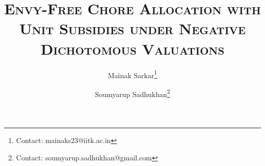 \documentclass[11pt]{article}
\begin{document}
\makeatletter
\renewcommand\@makefnmark{\hbox{\@textsuperscript{\normalfont\@thefnmark}}}
\makeatother
\renewcommand{\thefootnote}{\fnsymbol{footnote}}



\title{\textsc{Envy-Free Chore Allocation with Unit Subsidies under Negative Dichotomous Valuations
}}

\author[1]{Mainak Sarkar\footnote{Contact: mainaks23@iitk.ac.in}}
\author[1]{Soumyarup Sadhukhan\footnote{Contact: soumyarup.sadhukhan@gmail.com}}

\date{}


\maketitle
\renewcommand{\thefootnote}{\arabic{footnote}}
\setcounter{footnote}{0}











\appendix

% 

% 
\end{document}
